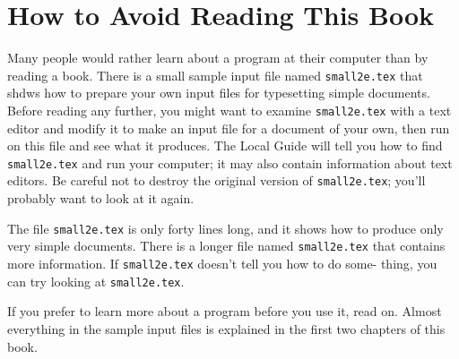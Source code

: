 \section{How to Avoid Reading This Book}
Many people would rather learn about a program at their computer than by reading a book. There is a small 
sample \ltx{} input file named \texttt{small2e.tex} that shdws how to prepare your own input files for 
typesetting simple documents. Before reading any further, you might want to examine \texttt{small2e.tex} with a text
editor and modify it to make an input file for a document of your own, then run \ltx{} on this file and see 
what it produces. The Local Guide will tell you how to find \texttt{small2e.tex} and run \ltx{} your computer; 
it may also contain information about text editors. Be careful not to destroy the original version of
\texttt{small2e.tex}; you'll probably want to look at it again.


The file \texttt{small2e.tex} is only forty lines long, and it shows how to produce
only very simple documents. There is a longer file named \texttt{small2e.tex} that
contains more information. If \texttt{small2e.tex} doesn't tell you how to do some-
thing, you can try looking at \texttt{small2e.tex}.

If you prefer to learn more about a program before you use it, read on.
Almost everything in the sample input files is explained in the first two chapters
of this book.